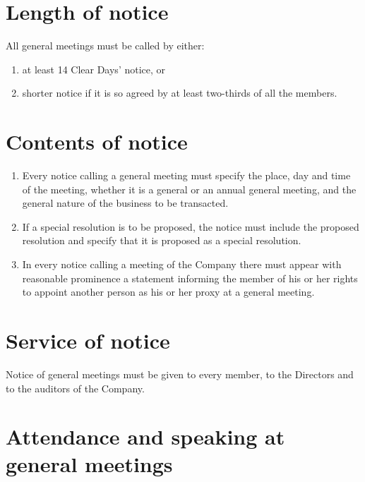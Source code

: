 \documentclass[a4paper,12pt]{article}
\begin{document}
\section{Length of notice}

All general meetings must be called by either:

\begin{enumerate}
  \item at least 14 Clear Days' notice, or
  \item shorter notice if it is so agreed by at least two-thirds of all the members.
\end{enumerate}

\section{Contents of notice}

\begin{enumerate}
  \item Every notice calling a general meeting must specify the place, day and time of the meeting, whether it is a general or an annual general meeting, and the general nature of the business to be transacted.
  \item If a special resolution is to be proposed, the notice must include the proposed resolution and specify that it is proposed as a special resolution.
  \item In every notice calling a meeting of the Company there must appear with reasonable prominence a statement informing the member of his or her rights to appoint another person as his or her proxy at a general meeting.
\end{enumerate}

\section{Service of notice}

Notice of general meetings must be given to every member, to the Directors and to the auditors of the Company.

\section{Attendance and speaking at general meetings}
\end{document}
